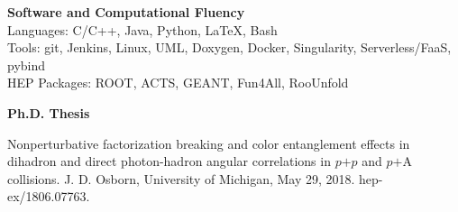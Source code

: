 \documentclass[11pt]{article}
\begin{document}
\vspace{3pt}
\begin{flushleft}
	\Large\textbf{Software and Computational Fluency} \\
	\normalsize
	Languages: C/C++, Java, Python, \LaTeX, Bash \\
	Tools: git, Jenkins, Linux, UML, Doxygen, Docker, Singularity, Serverless/FaaS, pybind\\
	HEP Packages: ROOT, ACTS, GEANT, Fun4All, RooUnfold
\end{flushleft}

\vspace{3pt}

\begin{flushleft}
\LARGE\textbf{Ph.D. Thesis} \\
\normalsize

		Nonperturbative factorization breaking and color entanglement effects in dihadron and direct photon-hadron angular correlations in $p$$+$$p$ and $p$$+$A collisions. J. D. Osborn, University of Michigan, May 29, 2018. hep-ex/1806.07763.
	
\end{flushleft}





\end{document}
